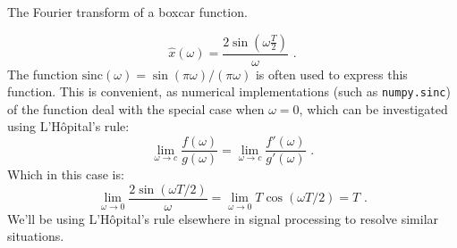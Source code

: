 \begin{marginfigure}
    \begin{center}


    \end{center}
    \caption{The Fourier transform of a boxcar function.}
\end{marginfigure}

\begin{equation}
    \boxed{
        \hat{x}(\omega) = \frac{2\sin(\omega \frac{T}{2})}{\omega}\,\,.
    }
\end{equation}
The function $\mathrm{sinc}(\omega)=\sin(\pi\omega)/(\pi\omega)$ is often used to express this function. 
This is convenient, as numerical implementations (such as \verb|numpy.sinc|) of the function deal with 
the special case when $\omega=0$, which can be investigated using L'H\^{o}pital's rule:
\begin{equation}
    \lim_{\omega \rightarrow c} \frac{f(\omega)}{g(\omega)} = \lim_{\omega \rightarrow c} \frac{f'(\omega)}{g'(\omega)}\,\,.
\end{equation}
Which in this case is:
\begin{equation}
    \lim_{\omega \rightarrow 0} \frac{2\sin(\omega T/2)}{\omega} = \lim_{\omega \rightarrow 0} T\cos(\omega T/2 ) = T\,\,.
\end{equation}
We'll be using L'H\^{o}pital's rule elsewhere in signal processing to resolve similar situations.

